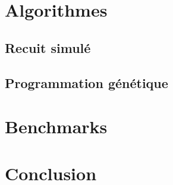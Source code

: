 \documentclass{report}
\begin{document}
\chapter{Algorithmes}

\section{Recuit simulé}

\section{Programmation génétique}

\chapter{Benchmarks}

\chapter{Conclusion}
\end{document}
